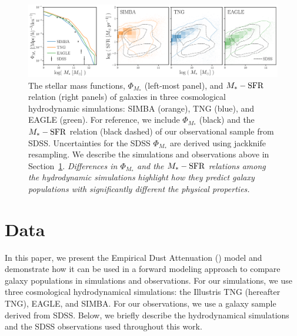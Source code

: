 \begin{figure}
\begin{center}
    \includegraphics[width=\textwidth]{figs/smf_m_sfr.pdf}
    \caption{\label{fig:smf_msfr}
    The stellar mass functions, $\Phi_{M_*}$ (left-most panel), and $M_*-{\rm SFR}$
    relation (right panels) of galaxies in three cosmological hydrodynamic 
    simulations: SIMBA (orange), TNG (blue), and EAGLE (green). 
    For reference, we include $\Phi_{M_*}$ (black) and the $M_*-{\rm SFR}$ relation 
    (black dashed) of our observational sample from SDSS. Uncertainties for the 
    SDSS $\Phi_{M_*}$ are derived using jackknife resampling. We describe the
    simulations and observations above in Section~\ref{sec:sims}. \emph{Differences
    in $\Phi_{M_*}$ and the $M_*-{\rm SFR}$ relations among the hydrodynamic simulations 
    highlight how they predict galaxy populations with significantly different
    the physical properties.} 
    }
\end{center}
\end{figure}

\section{Data}\label{sec:sims}
In this paper, we present the Empirical Dust Attenuation (\eda) model and
demonstrate how it can be used in a forward modeling approach to compare galaxy
populations in simulations and observations. For our simulations, we use three
cosmological hydrodynamical simulations: the Illustris TNG (hereafter TNG),
EAGLE, and SIMBA. For our observations, we use a galaxy sample derived from
SDSS. Below, we briefly describe the hydrodynamical simulations and the SDSS
observations used throughout this work.

